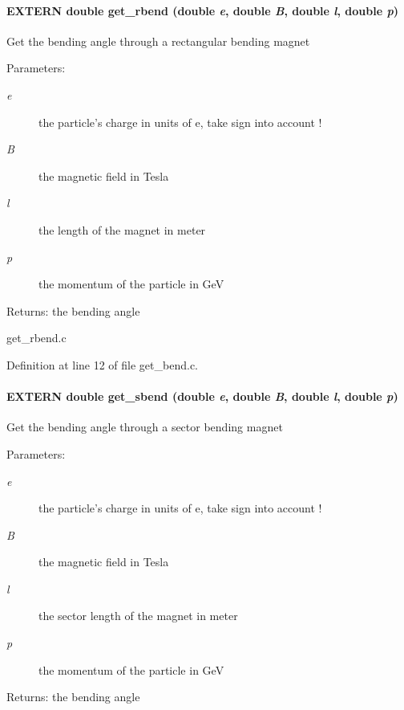\paragraph[get\_\-rbend]{\setlength{\rightskip}{0pt plus 5cm}EXTERN double get\_\-rbend (double {\em e}, \/  double {\em B}, \/  double {\em l}, \/  double {\em p})}\hfill\label{group__orbit_gee282e464a594845816e3d2815ca9431}


Get the bending angle through a rectangular bending magnet \begin{Desc}
\item[Parameters:]
\begin{description}
\item[{\em e}]the particle's charge in units of e, take sign into account ! \item[{\em B}]the magnetic field in Tesla \item[{\em l}]the length of the magnet in meter \item[{\em p}]the momentum of the particle in GeV \end{description}
\end{Desc}
\begin{Desc}
\item[Returns:]the bending angle\end{Desc}
get\_\-rbend.c 

Definition at line 12 of file get\_\-bend.c.
\paragraph[get\_\-sbend]{\setlength{\rightskip}{0pt plus 5cm}EXTERN double get\_\-sbend (double {\em e}, \/  double {\em B}, \/  double {\em l}, \/  double {\em p})}\hfill\label{group__orbit_ga34909631cf7159d9ec175e1a2231a9f}


Get the bending angle through a sector bending magnet \begin{Desc}
\item[Parameters:]
\begin{description}
\item[{\em e}]the particle's charge in units of e, take sign into account ! \item[{\em B}]the magnetic field in Tesla \item[{\em l}]the sector length of the magnet in meter \item[{\em p}]the momentum of the particle in GeV \end{description}
\end{Desc}
\begin{Desc}
\item[Returns:]the bending angle \end{Desc}


